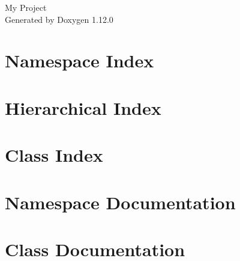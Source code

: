\documentclass[twoside]{book}
\newcommand{\+}{\discretionary{\mbox{\scriptsize$\hookleftarrow$}}{}{}}
\newcommand{\clearemptydoublepage}{%
    \newpage{\pagestyle{empty}\cleardoublepage}%
  }
\begin{document}
  \raggedbottom
    \hypersetup{pageanchor=false,
                bookmarksnumbered=true,
                pdfencoding=unicode
               }
  \begin{titlepage}
  \vspace*{7cm}
  \begin{center}%
  {\Large My Project}\\
  \vspace*{1cm}
  {\large Generated by Doxygen 1.12.0}\\
  \end{center}
  \end{titlepage}
  \clearemptydoublepage
  \tableofcontents
  \clearemptydoublepage
  \hypersetup{pageanchor=true}

\chapter{Namespace Index}

\chapter{Hierarchical Index}

\chapter{Class Index}

\chapter{Namespace Documentation}





\chapter{Class Documentation}





















  \backmatter
  \newpage
  \clearemptydoublepage
  \printindex
\end{document}
